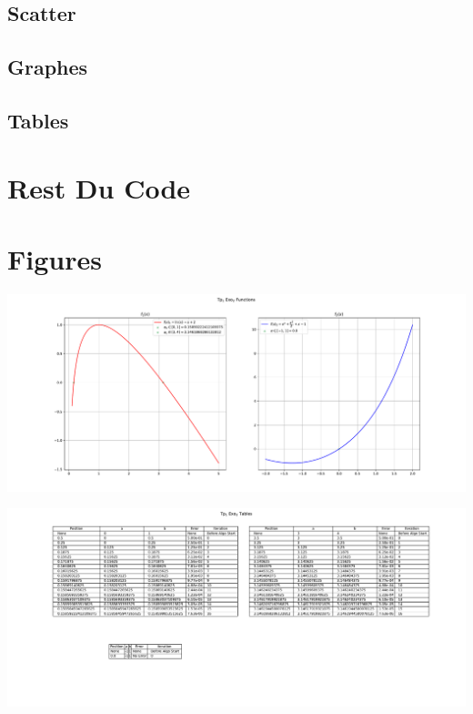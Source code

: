 \subsection{Scatter}


\vspace{0.5cm}

\subsection{Graphes}


\vspace{1cm}
\subsection{Tables}


\newpage
\section{Rest Du Code}


\newpage
\section{Figures}

\begin{center}
    \includegraphics[height=0.35\textheight]{Exercices/EX2/fig1.pdf}
\end{center}

\vspace{0.5cm}

\begin{center}
    \includegraphics[height=0.35\textheight]{Exercices/EX2/fig2.pdf}
\end{center}

